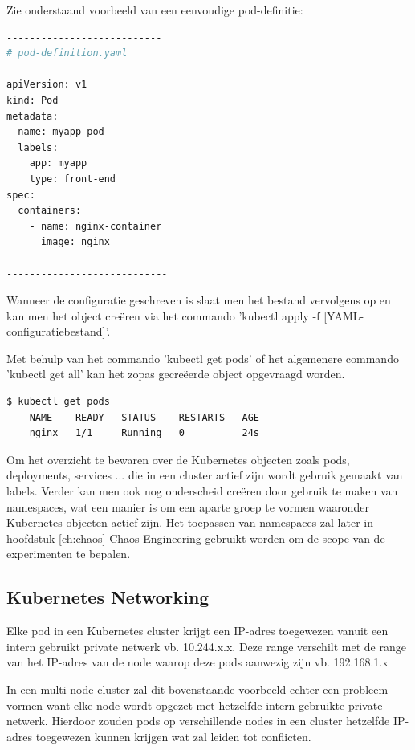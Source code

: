 Zie onderstaand voorbeeld van een eenvoudige pod-definitie:

\begin{lstlisting}[language=bash]
---------------------------
# pod-definition.yaml

apiVersion: v1
kind: Pod
metadata:
  name: myapp-pod
  labels:
    app: myapp
    type: front-end
spec:
  containers:
    - name: nginx-container
      image: nginx

----------------------------
\end{lstlisting}

Wanneer de configuratie geschreven is slaat men het bestand vervolgens op en kan men het object creëren via het commando 'kubectl apply -f [YAML-configuratiebestand]'. 

Met behulp van het commando 'kubectl get pods' of het algemenere commando 'kubectl get all' kan het zopas gecreëerde object opgevraagd worden. 

\begin{lstlisting}[language=bash]
    $ kubectl get pods
    NAME    READY   STATUS    RESTARTS   AGE
    nginx   1/1     Running   0          24s
\end{lstlisting}

Om het overzicht te bewaren over de Kubernetes objecten zoals pods, deployments, services ... die in een cluster actief zijn wordt gebruik gemaakt van labels. Verder kan men ook nog onderscheid creëren door gebruik te maken van namespaces, wat een manier is om een aparte groep te vormen waaronder Kubernetes objecten actief zijn. Het toepassen van namespaces zal later in hoofdstuk \ref{ch:chaos} Chaos Engineering gebruikt worden om de scope van de experimenten te bepalen. 

\subsection{Kubernetes Networking}

Elke pod in een Kubernetes cluster krijgt een IP-adres toegewezen vanuit een intern gebruikt private netwerk vb. 10.244.x.x. 
Deze range verschilt met de range van het IP-adres van de node waarop deze pods aanwezig zijn vb. 192.168.1.x

In een multi-node cluster zal dit bovenstaande voorbeeld echter een probleem vormen want elke node wordt opgezet met hetzelfde intern gebruikte private netwerk. Hierdoor zouden pods op verschillende nodes in een cluster hetzelfde IP-adres toegewezen kunnen krijgen wat zal leiden tot conflicten.

